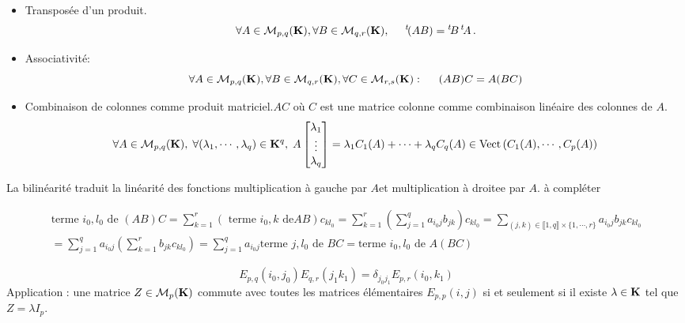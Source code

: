 \begin{prop}
\begin{itemize}
\item  Transposée d'un produit.
\[
 \forall A \in \mathcal{M}_{p,q}(\mathbf{K}), \forall B \in \mathcal{M}_{q,r}(\mathbf{K}), \hspace{0.5cm} \mathstrut^t\!{(AB)} = \mathstrut^t\!{B}\, \mathstrut^t\!{A}\,.
\]

\item Associativité:
\begin{displaymath}
 \forall A\in \mathcal M_{p,q}(\mathbf{K}), \forall B\in \mathcal M_{q,r}(\mathbf{K}), \forall C\in \mathcal M_{r,s}(\mathbf{K}) : \hspace{0.5cm}
(AB)C = A(BC)
\end{displaymath}

\item Combinaison de colonnes comme produit matriciel.$AC$ où $C$ est une matrice colonne comme combinaison linéaire des colonnes de $A$.
\[
 \forall A \in \mathcal{M}_{p,q}(\mathbf{K}),\; \forall (\lambda_1, \cdots, \lambda_q) \in \mathbf{K}^q, \;
 A 
\begin{bmatrix}
\lambda_1\\ \vdots \\ \lambda_q 
\end{bmatrix}
= \lambda_1 C_1(A) + \cdots + \lambda_q C_q(A)\in \mathop{\mathrm{Vect}}\left(C_1(A),\cdots,C_p(A) \right) 
\]
 \end{itemize}
\end{prop}
\begin{rem}
 La bilinéarité traduit la linéarité des fonctions \og multiplication à gauche par $A$\fg et \og multiplication à droitee par $A$\fg. à compléter 
\end{rem}

\begin{demo}
\begin{multline*}
 \text{terme $i_0,l_0$ de }(AB)C
=\sum_{k=1}^r(\text{ terme $i_0,k$ de}AB)c_{kl_0}
= \sum_{k=1}^r\left( \sum_{j=1}^qa_{i_0j}b_{jk}\right)c_{kl_0} 
=\sum_{(j,k)\in\llbracket 1,q \rrbracket\times\{1,\cdots,r\}}a_{i_0j}b_{jk}c_{kl_0} \\
= \sum_{j=1}^q a_{i_0j} \left( \sum_{k=1}^rb_{jk}c_{kl_0}\right) 
= \sum_{j=1}^q a_{i_0j}\text{terme $j,l_0$ de }BC
= \text{terme $i_0,l_0$ de }A(BC) 
\end{multline*}
\end{demo}


\begin{exple}
\begin{displaymath}
 E_{p,q}(i_0,j_0)E_{q,r}(j_1k_1) = \delta_{j_0j_1}E_{p,r}(i_0,k_1)
\end{displaymath}
 Application : une matrice $Z\in \mathcal M_{p}(\mathbf{K})$ commute avec toutes les matrices élémentaires $E_{p,p}(i,j)$ si et seulement si il existe $\lambda\in \mathbf{K}$ tel que $Z=\lambda I_p$.
\end{exple}

